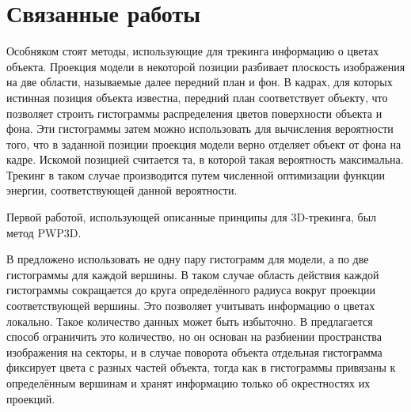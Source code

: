 \section{Связанные работы}


Особняком стоят методы, использующие для трекинга информацию о цветах объекта.
Проекция модели в некоторой позиции разбивает плоскость изображения на две
области, называемые далее передний план и фон.
В кадрах, для которых истинная позиция объекта известна, передний план
соответствует объекту, что позволяет строить гистограммы распределения цветов
поверхности объекта и фона.
Эти гистограммы затем можно использовать для вычисления вероятности того, что в
заданной позиции проекция модели верно отделяет объект от фона на кадре.
Искомой позицией считается та, в которой такая вероятность максимальна.
Трекинг в таком случае производится путем численной оптимизации функции
энергии, соответствующей данной вероятности.

Первой работой, использующей описанные принципы для 3D-трекинга,
был метод PWP3D\cite{PWP3D}.


В \cite{Tjaden2017} предложено использовать не одну пару гистограмм для модели,
а по две гистограммы для каждой вершины.
В таком случае область действия каждой гистограммы сокращается до круга
определённого радиуса вокруг проекции соответствующей вершины.
Это позволяет учитывать информацию о цветах локально.
Такое количество данных может быть избыточно.
В \cite{RegionPhotometric} предлагается способ ограничить это количество, но он
основан на разбиении пространства изображения на секторы, и  в случае поворота
объекта отдельная гистограмма фиксирует цвета с разных частей объекта, тогда
как в \cite{Tjaden2017} гистограммы привязаны к определённым вершинам и хранят
информацию только об окрестностях их проекций.

